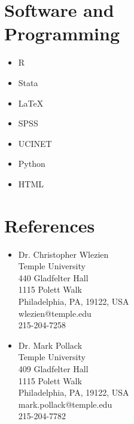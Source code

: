\documentclass[margin, 12pt]{res} %
\begin{document}
\begin{resume}

\section{Software and\\ Programming} 
\begin{itemize}
\item R
\item Stata
\item \LaTeX 
\item SPSS
\item UCINET
\item Python
\item HTML \\
\end{itemize}


\section{References}

\begin{minipage}[ht]{0.5\textwidth}

\begin{itemize}
\item Dr. Christopher Wlezien \\
Temple University \\
440 Gladfelter Hall \\
1115 Polett Walk \\
Philadelphia, PA, 19122, USA \\
wlezien@temple.edu \\
215-204-7258 \\
\end{itemize}

\begin{itemize}
\item Dr. Mark Pollack \\
Temple University \\
409 Gladfelter Hall \\
1115 Polett Walk \\
Philadelphia, PA, 19122, USA \\
mark.pollack@temple.edu \\
215-204-7782 \\
\end{itemize}


\end{minipage}
\end{resume}
\end{document}
